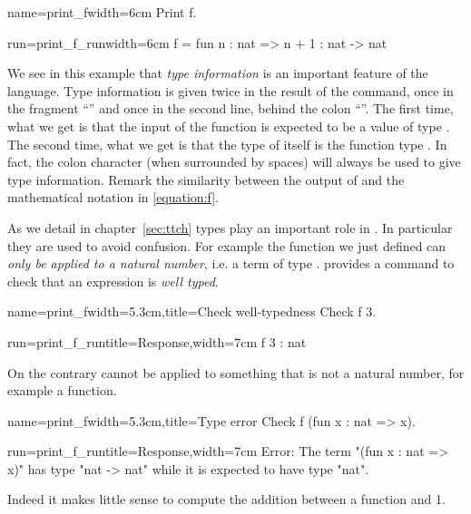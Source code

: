 \begin{coq}{name=print_f}{width=6cm}
Print f.
$~$
\end{coq}
\begin{coqout}{run=print_f_run}{width=6cm}
f = fun n : nat => n + 1
  : nat -> nat
\end{coqout}

We see in this example that {\em type information} is an important
feature of the language.  Type information is given twice in the
result of the  command, once in the fragment ``'' and once in the second line, behind the colon ``\C{:}''.  The first
time, what we get is that the input of the function is expected to be
a value of type .  The second time, what we get is that the
type of  itself is the function type .  In fact,
the colon character (when surrounded by spaces) will always be used to
give type information.  Remark the similarity between the output of 
and the mathematical notation in \eqref{equation:f}.

As we detail in chapter~\ref{sec:ttch} types play an important role in \Coq{}.
In particular they are used to avoid confusion.  For example
the function  we just defined can \emph{only
be applied to a natural number}, i.e. a term of type .
\Coq{} provides a command to check that an expression is \emph{well typed}.

\begin{coq}{name=print_f}{width=5.3cm,title=Check well-typedness}
Check f 3.
\end{coq}
\begin{coqout}{run=print_f_run}{title=Response,width=7cm}
 f 3 : nat
\end{coqout}
On the contrary  cannot be applied to something that 
is not a natural number, for example a function.

\begin{coq}{name=print_f}{width=5.3cm,title=Type error}
Check f (fun x : nat => x).
$~$
$~$
\end{coq}
\begin{coqout}{run=print_f_run}{title=Response,width=7cm}
Error: The term "(fun x : nat => x)"
has type "nat -> nat" while it is
expected to have type "nat".
\end{coqout}
Indeed it makes little sense to compute the addition between
a function and 1.

